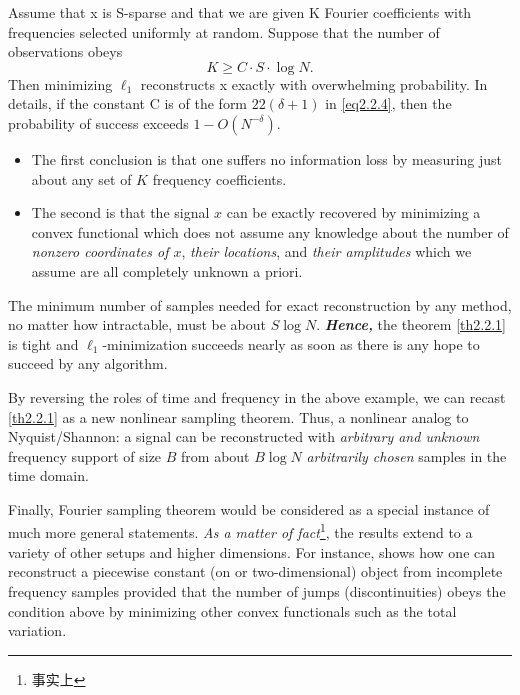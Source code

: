 \begin{theorem}
	\label{th2.2.1}
	Assume that x is S-sparse and that we are given K Fourier coefficients with frequencies selected uniformly at random. Suppose that the  number of observations obeys	
	\begin{equation}
	\label{eq2.2.4}
	K \geq C \cdot S \cdot \log N.
	\end{equation}
	Then minimizing $\ell_1$ reconstructs x exactly with overwhelming probability. In details, if the constant C is of the form $22(\delta+1)$ in \cref{eq2.2.4}, then the probability of success exceeds $1-O(N^{-\delta})$.
\end{theorem}
\begin{itemize}
	\item The first conclusion is that one suffers no information loss by measuring just about any set of $K$ frequency coefficients. 
	\item The second is that the signal $x$ can be exactly recovered by minimizing a convex functional which does not assume any knowledge about the number of \emph{nonzero coordinates of $x$}, \emph{their locations}, and \emph{their amplitudes} which we assume are all completely unknown a priori.  
\end{itemize}
The\textcolor[rgb]{1,0,0}{ minimum number of samples needed for exact reconstruction} by any method, no matter how intractable, \textcolor[rgb]{1,0,0}{must be about $S\log N$}. \emph{\textbf{Hence,}} the theorem \cref{th2.2.1} is tight and $\ell_1$-minimization succeeds nearly as soon as there is any hope to succeed by any algorithm.

By reversing the roles of time and frequency in the above example, we can recast \cref{th2.2.1} as a new nonlinear sampling theorem. Thus, a nonlinear analog to Nyquist/Shannon: a signal can be reconstructed with \emph{arbitrary and unknown} frequency support of size $B$ from about $B\log N$ \emph{arbitrarily chosen} samples in the time domain.

Finally, Fourier sampling theorem would be considered as a special instance of much more general statements. \emph{As a matter of fact}\footnote{事实上}, the results extend to a variety of other setups and higher dimensions. For instance, \cite{Candes2006} shows \textcolor[rgb]{1,0,0}{how one can reconstruct a piecewise constant (on or two-dimensional) object from incomplete frequency samples provided that the number of jumps (discontinuities) obeys the condition above by minimizing other convex functionals such as the total variation}.
